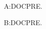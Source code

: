 \documentclass{article}
\begin{document}
\makeatletter
A:\ifx\@preamblecmds\@notprerr DOC\else PRE\fi.
\usepackage{onlyp}
B:\ifx\@preamblecmds\@notprerr DOC\else PRE\fi.
\makeatother
\end{document}
